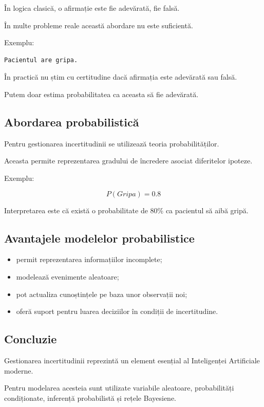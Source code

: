 \documentclass[12pt,a4paper]{article}
\begin{document}
În logica clasică, o afirmație este fie adevărată, fie falsă.

În multe probleme reale această abordare nu este suficientă.

Exemplu:

\begin{verbatim}
Pacientul are gripa.
\end{verbatim}

În practică nu știm cu certitudine dacă afirmația este adevărată sau falsă.

Putem doar estima probabilitatea ca aceasta să fie adevărată.

\subsection{Abordarea probabilistică}

Pentru gestionarea incertitudinii se utilizează teoria probabilităților.

Aceasta permite reprezentarea gradului de încredere asociat diferitelor ipoteze.

Exemplu:

\[
P(Gripa)=0.8
\]

Interpretarea este că există o probabilitate de 80\% ca pacientul să aibă gripă.

\subsection{Avantajele modelelor probabilistice}

\begin{itemize}
\item permit reprezentarea informațiilor incomplete;
\item modelează evenimente aleatoare;
\item pot actualiza cunoștințele pe baza unor observații noi;
\item oferă suport pentru luarea deciziilor în condiții de incertitudine.
\end{itemize}

\subsection{Concluzie}

Gestionarea incertitudinii reprezintă un element esențial al Inteligenței Artificiale moderne.

Pentru modelarea acesteia sunt utilizate variabile aleatoare, probabilități condiționate, inferență probabilistă și rețele Bayesiene.
\end{document}

